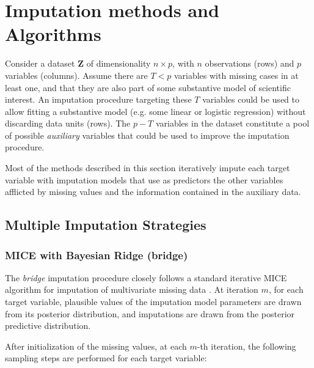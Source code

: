 \section{Imputation methods and Algorithms}


Consider a dataset $\bm{Z}$ of dimensionality $n \times p$, with $n$ observations (rows) and 
$p$ variables (columns). 
Assume there are $T < p$ variables with missing cases in at least one, and that they are also part 
of some substantive model of scientific interest. 
An imputation procedure targeting these $T$ variables could be used to allow fitting a substantive 
model (e.g. some linear or logistic regression) without discarding data units (rows).
The $p - T$ variables in the dataset constitute a pool of possible \emph{auxiliary} variables that
could be used to improve the imputation procedure.

Most of the methods described in this section iteratively impute each target variable with imputation 
models that use as predictors the other variables afflicted by missing values and the information 
contained in the auxiliary data. 

\subsection{Multiple Imputation Strategies}

\subsubsection{MICE with Bayesian Ridge (bridge)}
	The \emph{bridge} imputation procedure closely follows a standard iterative MICE algorithm for imputation of 
	multivariate missing data \citep[p. 120, algorithm 4.3]{vanBuuren:2012}.
	At iteration $m$, for each target variable, plausible values of the imputation model parameters are drawn from 
	its posterior distribution, and imputations are drawn from the posterior predictive distribution.

	After initialization of the missing values, at each $m$-th iteration, the following sampling steps are performed 
	for each target variable:

